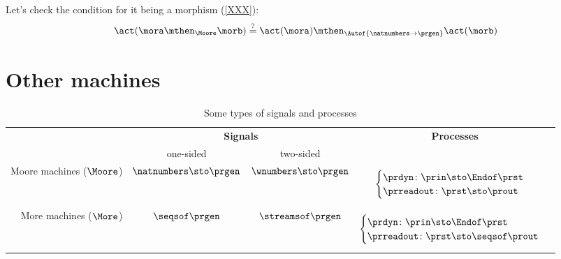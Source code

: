 Let's check the condition for it being a morphism (\cref{XXX}):
\begin{equation}
  \act ( \mora \mthen_{\Moore} \morb) \stackrel{?}{=}  \act ( \mora) \mthen_{\Autof  {\natnumbers \to \prgen}} \act(\morb)
\end{equation}


\section{Other machines}


\begin{table*}[b]
  \caption{Some types of signals and processes}
  \label{tab:processes-types}
  \begin{tabular}{rccc}
  & \multicolumn{2}{c}{\textbf{Signals}} & \textbf{Processes} \\
  &\rule{0pt}{10pt} one-sided & two-sided &   \\
  Moore machines ($\Moore$) &
  $\natnumbers \sto \prgen$
  &
  $\wnumbers \sto \prgen$
  &
  \begin{minipage}{4cm}\raggedright
  \begin{equation*}\label{eq:a}
      \begin{cases}
      \prdyn \colon \prin \sto \Endof \prst \\
      \prreadout \colon \prst \sto \prout
      \end{cases}
  \end{equation*}
  \end{minipage}
  \\
  
  More machines ($\More$)& $\seqsof \prgen$ &  $\streamsof \prgen$ &
  \begin{minipage}{4cm}\raggedright
  \begin{equation*}
  \begin{cases}
  \prdyn \colon \prin \sto \Endof \prst \\
  \prreadout \colon \prst \sto \seqsof \prout
  \end{cases}
  \end{equation*}
  

\end{minipage}
\end{tabular}
\end{table*}
